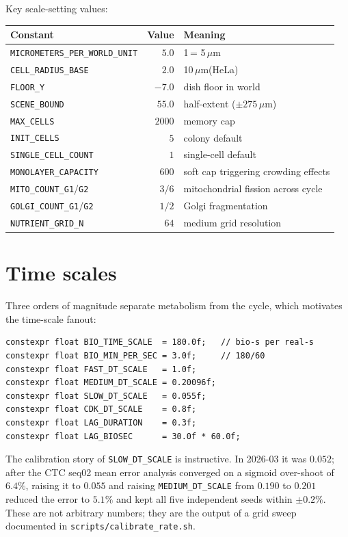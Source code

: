 \documentclass[11pt,letterpaper,twoside,openany]{book}
\newcommand{\code}[1]{\texttt{#1}}
\newcommand{\file}[1]{\texttt{\small#1}}
\newcommand{\wu}{\text{wu}}
\newcommand{\um}{\ensuremath{\mu\text{m}}}
\begin{document}
Key scale-setting values:
\begin{longtable}{lrl}
\toprule
\textbf{Constant} & \textbf{Value} & \textbf{Meaning}\\ \midrule
\code{MICROMETERS\_PER\_WORLD\_UNIT}     & $5.0$       & 1\,\wu = 5\,\um\\
\code{CELL\_RADIUS\_BASE}                 & $2.0$       & 10\,\um (HeLa)\\
\code{FLOOR\_Y}                           & $-7.0$      & dish floor in world\\
\code{SCENE\_BOUND}                       & $55.0$      & half-extent ($\pm 275\,\um$)\\
\code{MAX\_CELLS}                         & $2000$      & memory cap\\
\code{INIT\_CELLS}                        & $5$         & colony default\\
\code{SINGLE\_CELL\_COUNT}                & $1$         & single-cell default\\
\code{MONOLAYER\_CAPACITY}                & $600$       & soft cap triggering crowding effects\\
\code{MITO\_COUNT\_G1}/\code{G2}          & $3/6$       & mitochondrial fission across cycle\\
\code{GOLGI\_COUNT\_G1}/\code{G2}         & $1/2$       & Golgi fragmentation\\
\code{NUTRIENT\_GRID\_N}                  & $64$        & medium grid resolution\\
\bottomrule
\end{longtable}

\section{Time scales}

Three orders of magnitude separate metabolism from the cycle, which
motivates the time-scale fanout:
\begin{lstlisting}
constexpr float BIO_TIME_SCALE  = 180.0f;   // bio-s per real-s
constexpr float BIO_MIN_PER_SEC = 3.0f;     // 180/60
constexpr float FAST_DT_SCALE   = 1.0f;
constexpr float MEDIUM_DT_SCALE = 0.20096f;
constexpr float SLOW_DT_SCALE   = 0.055f;
constexpr float CDK_DT_SCALE    = 0.8f;
constexpr float LAG_DURATION    = 0.3f;
constexpr float LAG_BIOSEC      = 30.0f * 60.0f;
\end{lstlisting}

The calibration story of \code{SLOW\_DT\_SCALE} is instructive. In
2026-03 it was \(0.052\); after the CTC seq02 mean error analysis
converged on a sigmoid over-shoot of \(6.4\%\), raising it to
\(0.055\) and raising \code{MEDIUM\_DT\_SCALE} from \(0.190\) to
\(0.201\) reduced the error to \(5.1\%\) and kept all five
independent seeds within \(\pm 0.2\%\). These are not arbitrary
numbers; they are the output of a grid sweep documented in
\file{scripts/calibrate\_rate.sh}.
\end{document}
